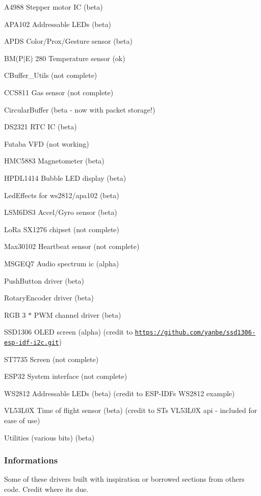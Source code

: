\begin{DoxyItemize}
\item A4988 Stepper motor IC (beta)
\item A\+P\+A102 Addressable L\+E\+Ds (beta)
\item A\+P\+DS Color/\+Prox/\+Gesture sensor (beta)
\item BM(P$\vert$E) 280 Temperature sensor (ok)
\item C\+Buffer\+\_\+\+Utils (not complete)
\item C\+C\+S811 Gas sensor (not complete)
\item Circular\+Buffer (beta -\/ now with packet storage!)
\item D\+S2321 R\+TC IC (beta)
\item Futaba V\+FD (not working)
\item H\+M\+C5883 Magnetometer (beta)
\item H\+P\+D\+L1414 Bubble L\+ED display (beta)
\item Led\+Effects for ws2812/apa102 (beta)
\item L\+S\+M6\+D\+S3 Accel/\+Gyro sensor (beta)
\item Lo\+Ra S\+X1276 chipset (not complete)
\item Max30102 Heartbeat sensor (not complete)
\item M\+S\+G\+E\+Q7 Audio spectrum ic (alpha)
\item Push\+Button driver (beta)
\item Rotary\+Encoder driver (beta)
\item R\+GB 3 $\ast$ P\+WM channel driver (beta)
\item S\+S\+D1306 O\+L\+ED screen (alpha) (credit to \href{https://github.com/yanbe/ssd1306-esp-idf-i2c.git}{\tt https\+://github.\+com/yanbe/ssd1306-\/esp-\/idf-\/i2c.\+git})
\item S\+T7735 Screen (not complete)
\item E\+S\+P32 System interface (not complete)
\item W\+S2812 Addressable L\+E\+Ds (beta) (credit to E\+S\+P-\/\+I\+DF\textquotesingle{}s W\+S2812 example)
\item V\+L53\+L0X Time of flight sensor (beta) (credit to ST\textquotesingle{}s V\+L53\+L0X api -\/ included for ease of use)
\item Utilities (various bits) (beta)
\end{DoxyItemize}

\subsubsection*{Informations}

Some of these drivers built with inspiration or borrowed sections from other\textquotesingle{}s code. Credit where it\textquotesingle{}s due. 
